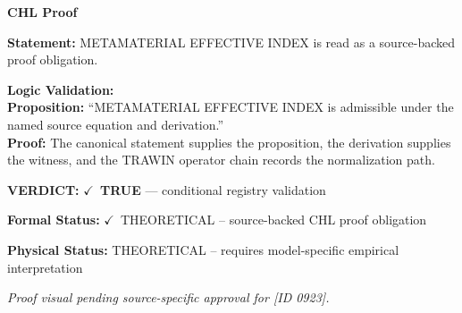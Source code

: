 \vspace{0.45em}
\noindent\textbf{CHL Proof}\par
\textbf{Statement:} METAMATERIAL EFFECTIVE INDEX is read as a source-backed proof obligation.

\textbf{Logic Validation:}\\
\textbf{Proposition:} ``METAMATERIAL EFFECTIVE INDEX is admissible under the named source equation and derivation.''\\
\textbf{Proof:} The canonical statement supplies the proposition, the derivation supplies the witness, and the TRAWIN operator chain records the normalization path.

\textbf{VERDICT:} \ensuremath{\checkmark}\ \textbf{TRUE} --- conditional registry validation

\textbf{Formal Status:} \ensuremath{\checkmark}\ THEORETICAL -- source-backed CHL proof obligation

\textbf{Physical Status:} THEORETICAL -- requires model-specific empirical interpretation
\par\vspace{0.45em}
\par
\vfill
\begingroup\footnotesize\itshape
Proof visual pending source-specific approval for [ID 0923].
\par\endgroup
\vfill
\endgroup
\endgroup
